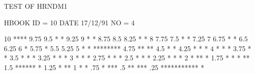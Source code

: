 \begin{Listing}
 TEST OF HRNDM1                                                                  
 
 HBOOK     ID =        10                                        DATE  17/12/91              NO =   4
 
       10                                   ****
        9.75
        9.5                                *    *
        9.25
        9                                 *      *
        8.75
        8.5
        8.25                             *        *
        8
        7.75
        7.5                             *          *
        7.25
        7
        6.75                           *            *
        6.5
        6.25
        6                                            *
        5.75                          *
        5.5
        5.25
        5                            *                *                           ********
        4.75                                                                    **        **
        4.5                                                                    *            *
        4.25                                           *                      *              *
        4                           *                                        *                *
        3.75                                                                *                  *
        3.5                                             *                  *                    *
        3.25                       *                                      *                      *
        3                                                *               *                        *
        2.75                      *                                     *                          *
        2.5                                               *            *                            *
        2.25                     *                                    *                              *
        2                                                  *        **                                *
        1.75                    *                           *      *                                   **
        1.5                                                  ******                                      *
        1.25                   *                                                                          **
        1                     *                                                                             *
         .75                 *                                                                               ***
         .5                **                                                                                   ***
         .25    ***********                                                                                        *
 

\end{Listing}
